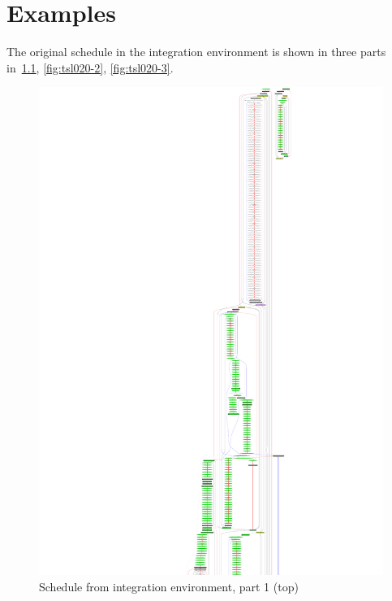 \documentclass[12pt,a4paper]{report}
\begin{document}
\chapter{Examples}
The original schedule in the integration environment is shown in three parts in~\ref{fig:tsl020-1},
\ref{fig:tsl020-2}, \ref{fig:tsl020-3}.
    \begin{figure}
        \centering
        \includegraphics*[height=1.0\textheight,keepaspectratio]{tsl020-1.pdf}
        \caption{Schedule from integration environment, part 1 (top)}
        \label{fig:tsl020-1}
    \end{figure}
\end{document}
